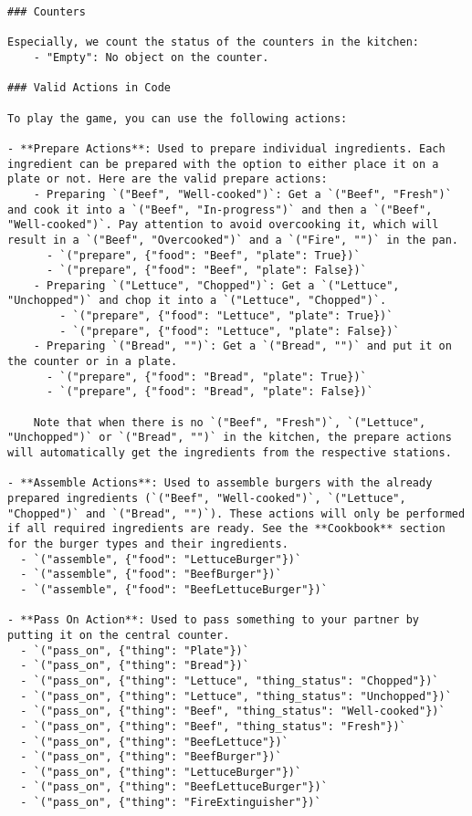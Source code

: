 \begin{lstlisting}
### Counters

Especially, we count the status of the counters in the kitchen:
    - "Empty": No object on the counter.

### Valid Actions in Code

To play the game, you can use the following actions:

- **Prepare Actions**: Used to prepare individual ingredients. Each ingredient can be prepared with the option to either place it on a plate or not. Here are the valid prepare actions:
    - Preparing `("Beef", "Well-cooked")`: Get a `("Beef", "Fresh")` and cook it into a `("Beef", "In-progress")` and then a `("Beef", "Well-cooked")`. Pay attention to avoid overcooking it, which will result in a `("Beef", "Overcooked")` and a `("Fire", "")` in the pan.
      - `("prepare", {"food": "Beef", "plate": True})`
      - `("prepare", {"food": "Beef", "plate": False})`
    - Preparing `("Lettuce", "Chopped")`: Get a `("Lettuce", "Unchopped")` and chop it into a `("Lettuce", "Chopped")`.
        - `("prepare", {"food": "Lettuce", "plate": True})`
        - `("prepare", {"food": "Lettuce", "plate": False})`
    - Preparing `("Bread", "")`: Get a `("Bread", "")` and put it on the counter or in a plate.
      - `("prepare", {"food": "Bread", "plate": True})`
      - `("prepare", {"food": "Bread", "plate": False})`

    Note that when there is no `("Beef", "Fresh")`, `("Lettuce", "Unchopped")` or `("Bread", "")` in the kitchen, the prepare actions will automatically get the ingredients from the respective stations.

- **Assemble Actions**: Used to assemble burgers with the already prepared ingredients (`("Beef", "Well-cooked")`, `("Lettuce", "Chopped")` and `("Bread", "")`). These actions will only be performed if all required ingredients are ready. See the **Cookbook** section for the burger types and their ingredients.
  - `("assemble", {"food": "LettuceBurger"})`
  - `("assemble", {"food": "BeefBurger"})`
  - `("assemble", {"food": "BeefLettuceBurger"})`

- **Pass On Action**: Used to pass something to your partner by putting it on the central counter.
  - `("pass_on", {"thing": "Plate"})`
  - `("pass_on", {"thing": "Bread"})`
  - `("pass_on", {"thing": "Lettuce", "thing_status": "Chopped"})`
  - `("pass_on", {"thing": "Lettuce", "thing_status": "Unchopped"})`
  - `("pass_on", {"thing": "Beef", "thing_status": "Well-cooked"})`
  - `("pass_on", {"thing": "Beef", "thing_status": "Fresh"})`
  - `("pass_on", {"thing": "BeefLettuce"})`
  - `("pass_on", {"thing": "BeefBurger"})`
  - `("pass_on", {"thing": "LettuceBurger"})`
  - `("pass_on", {"thing": "BeefLettuceBurger"})`
  - `("pass_on", {"thing": "FireExtinguisher"})`


\end{lstlisting}

